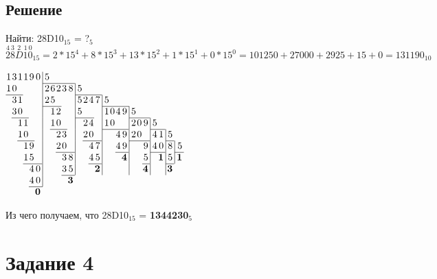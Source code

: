 \documentclass[11pt]{article}
\begin{document}
\subsection{Решение}
\label{sec:org79627d7}
Найти: 28D10\(_{\text{15}}\) = ?\(_{\text{5}}\) \\
\(\overset{4}{2}\overset{3}{8}\overset{2}{D}\overset{1}{1}\overset{0}{0}_{15} = 
2 * 15^4 + 8 * 15^3 + 13 * 15^2 + 1 * 15^1 + 0 * 15^0 =
101250 + 27000 + 2925 + 15 + 0 =
131190_{10}\) 
\begin{center}
\(\arraycolsep=0.05em
\begin{array}{rrrrrr@{\,}r|rrrrr@{\,}r|rrrr@{\,}r|rrrr@{\,}r|rrr@{\,}r|rr@{\,}r|r@{\,}r|r@{\,}r|r}
1 & 3 & 1 & 1 & 9 & 0 &&\, 5 \\
\cline{8-12}
1 & 0 &&&&&&            \, 2 & 6 & 2 & 3 & 8 &&\, 5 \\
\cline{1-3}\cline{14-17}
&   3 & 1 &&&&&            2 & 5 &&&&&         \, 5 & 2 & 4 & 7 &&\, 5 \\
\cline{8-10}\cline{19-23}
&   3 & 0 &&&&&&               1 & 2 &&&&         5 &&&&&         \, 1 & 0 & 4 & 9 &&\, 5 \\
\cline{2-4}\cline{14-16}\cline{24-26}
&&      1 & 1 &&&&&            1 & 0  &&&&&           2 & 4 &&&      1 & 0 &&&&      \, 2 & 0 & 9 &&\, 5 \\
\cline{9-11}\cline{19-22}\cline{28-29}
&&      1 & 0 &&&&&&               2 & 3 &&&&         2 & 0 &&&&&            4 & 9 &&   2 & 0 &&&   \, 4 & 1 &&\, 5 \\
\cline{3-5}\cline{15-17}\cline{24-26}\cline{31-31}
&&&         1 & 9 &&&&&            2 & 0 &&&&&            4 & 7 &&&&         4 & 9 &&&&         9 &&\, 4 & 0 &&\, 8 &&\, 5 \\
\cline{10-12}\cline{21-22}\cline{28-29}\cline{33-33}
&&&         1 & 5 &&&&&&               3 & 8 &&&&         4 & 5 &&&&&    \textbf{4} &&&&        5 &&&\textbf{1}&& 5 &&\, \textbf{1} \\
\cline{4-6}\cline{16-17}\cline{26-26}\cline{31-31}
&&&&            4 & 0 &&&&&            3 & 5 &&&&&    \textbf{2} &&&&&&&&&              \textbf{4} &&&&&      \textbf{3} \\
\cline{11-12}
&&&&            4 & 0 &&&&&&       \textbf{3}\\
\cline{5-7}
&&&&&       \textbf{0} 
\end{array}\)
\end{center}
Из чего получаем, что 28D10\(_{\text{15}}\) = \textbf{1344230\(_{\text{5}}\)}

\section{Задание 4}
\label{sec:org6f5e6f9}
\end{document}
